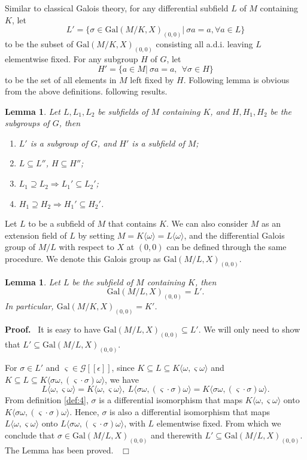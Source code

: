 \documentclass[preprint, 12pt]{elsarticle}
\newtheorem{lem}[thm]{Lemma}
\numberwithin{equation}{section}
\newenvironment{proof}[1][Proof]{\textbf{#1.}\ }{\ $\Box$}
\newcommand{\G}{\mathcal{G}}
\newcommand{\Gal}{\mathrm{Gal}}
\newcommand{\CA}{\G[[\epsilon]]}
\begin{document}
Similar to classical Galois theory, for any differential subfield
$L$ of $M$ containing $K$, let
$$L' = \{\sigma\in \Gal(M/K,X)_{(0,0)}|\ \sigma a = a, \forall a\in L\}$$
to be the subset of $\Gal(M/K,X)_{(0,0)}$ consisting all a.d.i.
leaving $L$ elementwise fixed. For any subgroup $H$ of $G$, let
$$H' = \{a\in M |\ \sigma a = a,\ \ \forall \sigma\in H\}$$
to be the set of all elements in $M$ left fixed by $H$. Following lemma is obvious from the above definitions.
following results.
\begin{lem}
\label{le:6} Let $L, L_1,L_2$ be subfields of $M$ containing $K$,
and $H,H_1,H_2$ be the subgroups of $G$, then
\begin{enumerate}
  \item[(1).] $L'$ is a subgroup of $G$, and $H'$ is a
  subfield of $M$;
  \item[(2).] $L\subseteq L''$, $H\subseteq H''$;
  \item[(3).] $L_1\supseteq L_2\Rightarrow L_1'\subseteq L_2'$;
  \item[(4).] $H_1\supseteq H_2\Rightarrow H_1'\subseteq H_2'$.
\end{enumerate}
\end{lem}

Let $L$ to be a subfield of $M$ that contains $K$. We can also consider $M$ as an extension field
of $L$ by setting $M = K\langle \omega\rangle = L \langle \omega \rangle$, and the differential Galois group of $M/L$ with respect to $X$ at $(0,0)$ can be defined through the same procedure. We denote this
Galois group as $\Gal(M/L,X)_{(0,0)}$.

\begin{lem}
\label{le:3} Let $L$ be the subfield of $M$ containing $K$, then
$$\Gal(M/L, X)_{(0,0)} = L'.$$ 
In particular, $\Gal(M/K,X)_{(0,0)} = K'$.
\end{lem}
\begin{proof}
It is easy to have $\Gal(M/L,X)_{(0,0)}\subseteq L'$. We will only need to show
that $L'\subseteq \Gal(M/L,X)_{(0,0)}$. 

For $\sigma \in L'$ and $\varsigma\in\CA$, since $K\subseteq L \subseteq K\langle
\omega, \varsigma\omega\rangle$ and $K\subseteq L\subseteq
K\langle \sigma\omega, (\varsigma\cdot\sigma)\omega\rangle$, we
have
$$L\langle \omega, \varsigma\omega\rangle = K\langle \omega, \varsigma\omega\rangle,\
L\langle \sigma\omega, (\varsigma\cdot\sigma)\omega\rangle =
K\langle \sigma\omega, (\varsigma\cdot\sigma)\omega\rangle.$$
From definition \ref{def:4}, $\sigma$ is a differential isomorphism that maps $K\langle \omega, \varsigma \omega \rangle$ onto $K\langle \sigma\omega, (\varsigma\cdot\sigma)\omega\rangle$. Hence, $\sigma$ is also a differential isomorphism that maps $L\langle \omega,
\varsigma\omega\rangle$ onto $L\langle \sigma \omega,
(\varsigma\cdot\sigma)\omega\rangle$, with $L$ elementwise fixed.
From which we conclude that $\sigma\in \Gal(M/L,X)_{(0,0)}$ and
therewith $L'\subseteq \Gal(M/L,X)_{(0,0)}$. The Lemma has been
proved.
\end{proof}
\end{document}
